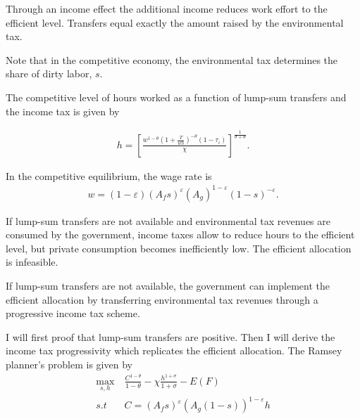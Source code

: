   Through an income effect the additional income reduces work effort to the efficient level. Transfers equal exactly the amount raised by the environmental tax. 

Note that in the competitive economy, the environmental tax determines the share of dirty labor, $s$. 

The competitive level of hours worked as a function of lump-sum transfers and the income tax is given by

\begin{align}
h = \left[\frac{w^{1-\theta}\left(1+\frac{T}{wh}\right)^{-\theta}(1-\tau_{\iota})}{\chi}\right]^{\frac{1}{\sigma+\theta}}.\label{eq:hopt}
\end{align}


In the competitive equilibrium, the wage rate is
\begin{align}
w= (1-\varepsilon)(A_fs)^\varepsilon (A_g)^{1-\varepsilon}(1-s)^{-\varepsilon}. \label{eq:compw}
\end{align}


\begin{prop}
	If lump-sum transfers are not available and environmental tax revenues are consumed by the government, income taxes allow to reduce hours to the efficient level, but private consumption becomes inefficiently low. %
	The efficient allocation is infeasible.
\end{prop}

\begin{prop}
	If lump-sum transfers are not available, the government can implement the efficient allocation by  transferring environmental tax revenues through a progressive income tax scheme.
\end{prop}

I will first proof that lump-sum transfers are positive. Then I will derive the income tax progressivity which replicates the efficient allocation. 
The Ramsey planner's problem is given by
\begin{align}
\underset{s, h}{\max}\ & \frac{C^{1-\theta}}{1-\theta}-\chi \frac{h^{1+\sigma}}{1+\sigma}-E(F)\\
s.t\ \ & C=\left(A_fs\right)^{\varepsilon}\left(A_g(1-s)\right)^{1-\varepsilon}h
\end{align}

